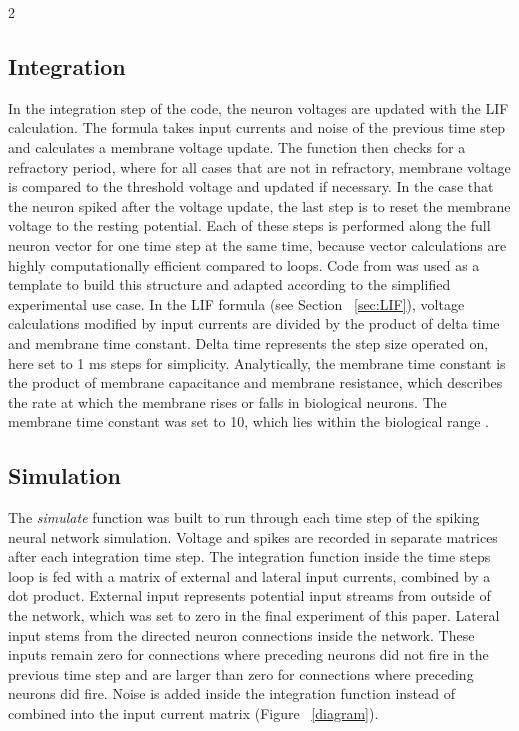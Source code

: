 \documentclass[12pt,a4paper]{article}
\begin{document}
\begin{multicols}{2}
        \subsection{Integration}
            In the integration step of the code, the neuron voltages are updated with the LIF calculation. The formula takes input currents and noise of the previous time step and calculates a membrane voltage update. The function then checks for a refractory period, where for all cases that are not in refractory, membrane voltage is compared to the threshold voltage and updated if necessary. In the case that the neuron spiked after the voltage update, the last step is to reset the membrane voltage to the resting potential. Each of these steps is performed along the full neuron vector for one time step at the same time, because vector calculations are highly computationally efficient compared to loops. Code from \textcite{L} was used as a template to build this structure and adapted according to the simplified experimental use case. In the LIF formula (see Section ~\ref{sec:LIF}), voltage calculations modified by input currents are divided by the product of delta time and membrane time constant. Delta time represents the step size operated on, here set to 1 ms steps for simplicity. Analytically, the membrane time constant is the product of membrane capacitance and membrane resistance, which describes the rate at which the membrane rises or falls in biological neurons. The membrane time constant was set to 10, which lies within the biological range \cite{S}.
            
        \subsection{Simulation}
            The \textit{simulate} function was built to run through each time step of the spiking neural network simulation. Voltage and spikes are recorded in separate matrices after each integration time step. The integration function inside the time steps loop is fed with a matrix of external and lateral input currents, combined by a dot product. External input represents potential input streams from outside of the network, which was set to zero in the final experiment of this paper. Lateral input stems from the directed neuron connections inside the network. These inputs remain zero for connections where preceding neurons did not fire in the previous time step and are larger than zero for connections where preceding neurons did fire. Noise is added inside the integration function instead of combined into the input current matrix (Figure ~\ref{diagram}).


\end{multicols}
\end{document}
